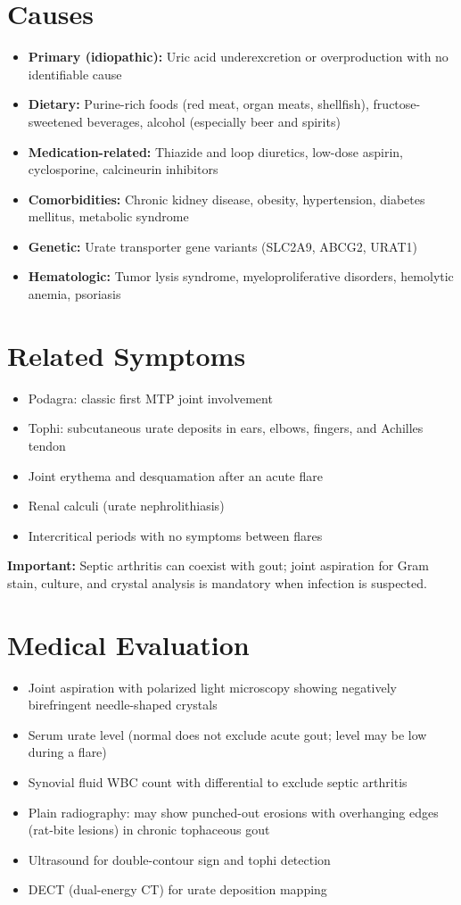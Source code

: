 \section*{Causes}
\begin{itemize}
  \item \textbf{Primary (idiopathic):} Uric acid underexcretion or overproduction with no identifiable cause
  \item \textbf{Dietary:} Purine-rich foods (red meat, organ meats, shellfish), fructose-sweetened beverages, alcohol (especially beer and spirits)
  \item \textbf{Medication-related:} Thiazide and loop diuretics, low-dose aspirin, cyclosporine, calcineurin inhibitors
  \item \textbf{Comorbidities:} Chronic kidney disease, obesity, hypertension, diabetes mellitus, metabolic syndrome
  \item \textbf{Genetic:} Urate transporter gene variants (SLC2A9, ABCG2, URAT1)
  \item \textbf{Hematologic:} Tumor lysis syndrome, myeloproliferative disorders, hemolytic anemia, psoriasis
\end{itemize}

\section*{Related Symptoms}
\begin{itemize}
  \item Podagra: classic first MTP joint involvement
  \item Tophi: subcutaneous urate deposits in ears, elbows, fingers, and Achilles tendon
  \item Joint erythema and desquamation after an acute flare
  \item Renal calculi (urate nephrolithiasis)
  \item Intercritical periods with no symptoms between flares
\end{itemize}
\textbf{Important:} Septic arthritis can coexist with gout; joint aspiration for Gram stain, culture, and crystal analysis is mandatory when infection is suspected.

\section*{Medical Evaluation}
\begin{itemize}
  \item Joint aspiration with polarized light microscopy showing negatively birefringent needle-shaped crystals
  \item Serum urate level (normal does not exclude acute gout; level may be low during a flare)
  \item Synovial fluid WBC count with differential to exclude septic arthritis
  \item Plain radiography: may show punched-out erosions with overhanging edges (rat-bite lesions) in chronic tophaceous gout
  \item Ultrasound for double-contour sign and tophi detection
  \item DECT (dual-energy CT) for urate deposition mapping
\end{itemize}


